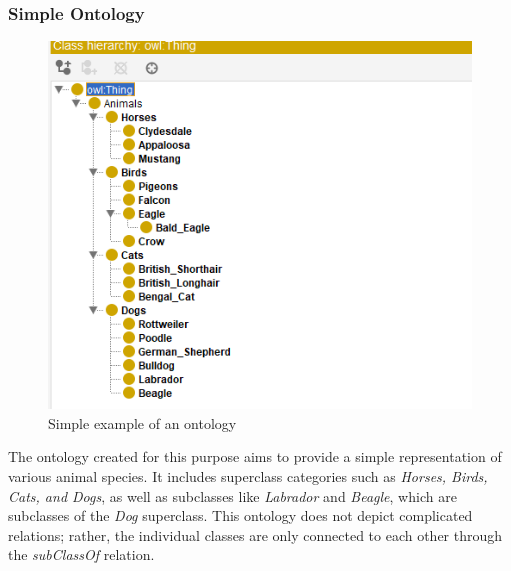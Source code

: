 \subsubsection{Simple Ontology}

\begin{figure}[H]
\includegraphics[scale=0.5]{Graphics/simple_ontology_owlviz.png}
\caption{Simple example of an ontology}
\end{figure}

The ontology created for this purpose aims to provide a simple representation of various animal species. It includes superclass categories such as \textit{Horses, Birds, Cats, and Dogs}, as well as subclasses like \textit{Labrador} and \textit{Beagle}, which are subclasses of the \textit{Dog} superclass. This ontology does not depict complicated relations; rather, the individual classes are only connected to each other through the \textit{subClassOf} relation.

